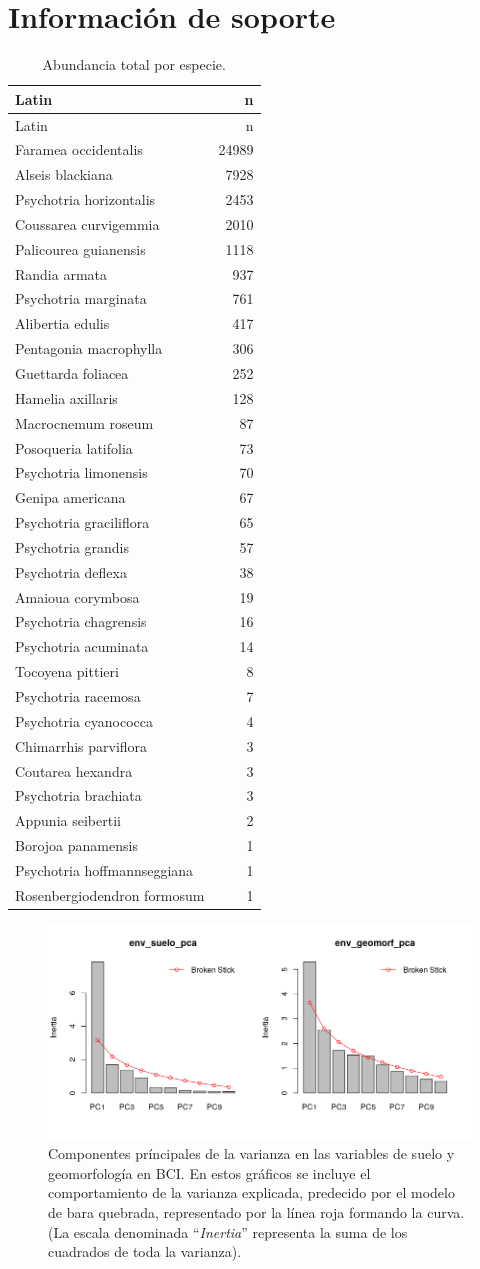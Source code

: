 \documentclass[11pt,]{article}
\begin{document}
\section {Información de soporte} \label{inf_supletary}

\beginsupplement

\begin{longtable}[]{@{}lr@{}}
\caption{\label{tab:abun_sp}Abundancia total por
especie.}\tabularnewline
\toprule
Latin & n\tabularnewline
\midrule
\endfirsthead
\toprule
Latin & n\tabularnewline
\midrule
\endhead
Faramea occidentalis & 24989\tabularnewline
Alseis blackiana & 7928\tabularnewline
Psychotria horizontalis & 2453\tabularnewline
Coussarea curvigemmia & 2010\tabularnewline
Palicourea guianensis & 1118\tabularnewline
Randia armata & 937\tabularnewline
Psychotria marginata & 761\tabularnewline
Alibertia edulis & 417\tabularnewline
Pentagonia macrophylla & 306\tabularnewline
Guettarda foliacea & 252\tabularnewline
Hamelia axillaris & 128\tabularnewline
Macrocnemum roseum & 87\tabularnewline
Posoqueria latifolia & 73\tabularnewline
Psychotria limonensis & 70\tabularnewline
Genipa americana & 67\tabularnewline
Psychotria graciliflora & 65\tabularnewline
Psychotria grandis & 57\tabularnewline
Psychotria deflexa & 38\tabularnewline
Amaioua corymbosa & 19\tabularnewline
Psychotria chagrensis & 16\tabularnewline
Psychotria acuminata & 14\tabularnewline
Tocoyena pittieri & 8\tabularnewline
Psychotria racemosa & 7\tabularnewline
Psychotria cyanococca & 4\tabularnewline
Chimarrhis parviflora & 3\tabularnewline
Coutarea hexandra & 3\tabularnewline
Psychotria brachiata & 3\tabularnewline
Appunia seibertii & 2\tabularnewline
Borojoa panamensis & 1\tabularnewline
Psychotria hoffmannseggiana & 1\tabularnewline
Rosenbergiodendron formosum & 1\tabularnewline
\bottomrule
\end{longtable}

\begin{figure}
\centering
\includegraphics{env_suelo_geomorf_pca_br_stick.png}
\caption{Componentes príncipales de la varianza en las variables de
suelo y geomorfología en BCI. En estos gráficos se incluye el
comportamiento de la varianza explicada, predecido por el modelo de bara
quebrada, representado por la línea roja formando la curva. (La escala
denominada ``\emph{Inertia}'' representa la suma de los cuadrados de
toda la varianza). \label{fig:pca_suelo_geomorf_br_stick}}
\end{figure}
\end{document}
